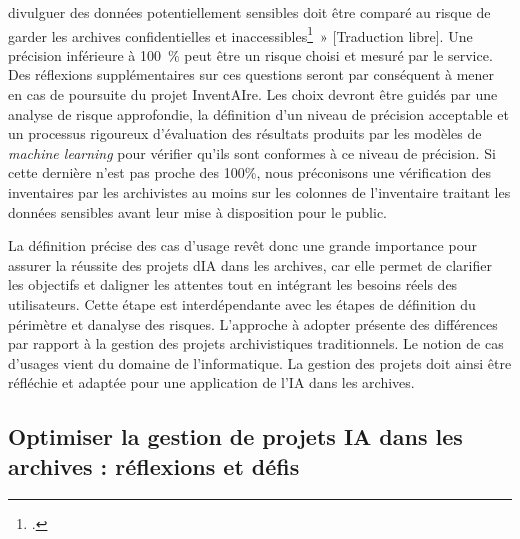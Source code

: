 divulguer des données potentiellement sensibles doit être comparé au
risque de garder les archives confidentielles et inaccessibles\footcite{jaillant_applying_2023}~»
{[}Traduction libre{]}. Une précision inférieure à
100~\% peut être un risque choisi et mesuré par le service. Des
réflexions supplémentaires sur ces questions seront par conséquent à
mener en cas de poursuite du projet InventAIre. Les choix devront être
guidés par une analyse de risque approfondie, la définition d'un niveau
de précision acceptable et un processus rigoureux d'évaluation des
résultats produits par les modèles de \emph{machine learning} pour
vérifier qu'ils sont conformes à ce niveau de précision.
Si cette dernière n'est pas proche des 100\%, nous préconisons 
une vérification des inventaires par les archivistes au moins sur 
les colonnes de l'inventaire traitant les données sensibles avant 
leur mise à disposition pour le public.
\newline

La définition précise des cas d'usage revêt donc une grande importance
pour assurer la réussite des projets d\textquotesingle IA dans les
archives, car elle permet de clarifier les objectifs et
d\textquotesingle aligner les attentes tout en intégrant les besoins
réels des utilisateurs. Cette étape est interdépendante avec les
étapes de définition du périmètre et d\textquotesingle analyse des
risques. L'approche à adopter présente des différences par rapport à
la gestion des projets archivistiques traditionnels. Le notion de cas
d'usages vient du domaine de l'informatique. La gestion des projets doit
ainsi être réfléchie et adaptée pour une application de l'IA dans les
archives.



\subsection{Optimiser la gestion de projets IA dans les archives : réflexions et défis}


